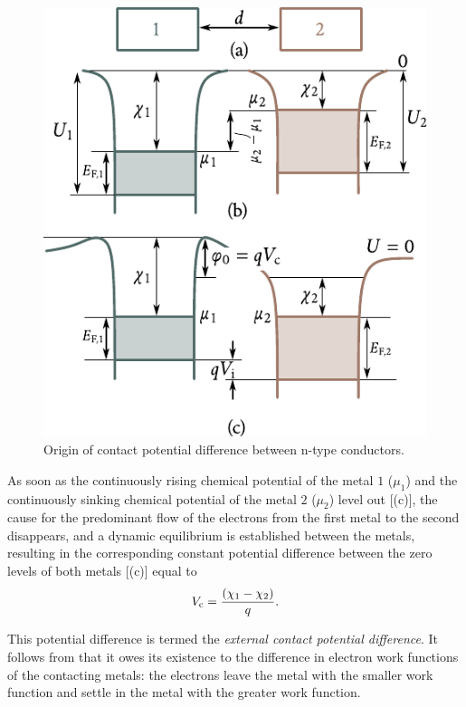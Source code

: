 \begin{figure}[t]
	\begin{center}
		\includegraphics[scale=1]{figures/ch_08/fig_8_4.pdf}
		\caption[]{Origin of contact potential difference between n-type conductors.}
		\label{fig:8_4}
	\end{center}
	\vspace{-0.8cm}
\end{figure}

As soon as the continuously rising chemical potential of the metal $1$ ($\mu_1$) and the continuously sinking chemical potential of the metal
$2$ ($\mu_2$) level out [(c)], the cause for the predominant flow of the electrons from the first metal to the second disappears, and a dynamic equilibrium is established between the metals, resulting in the corresponding constant potential difference between the zero levels of both metals [(c)] equal to
\begin{equation}\label{eq:8_1}
    V_{\text{c}} = \frac{(\chi_1 - \chi_2)}{q}.
\end{equation}

\noindent
This potential difference is termed the \textit{external contact potential difference}. It follows from  that it owes its existence to the difference in electron work functions of the contacting metals: the electrons leave the metal with the smaller work function and settle in the metal with the greater work function.

